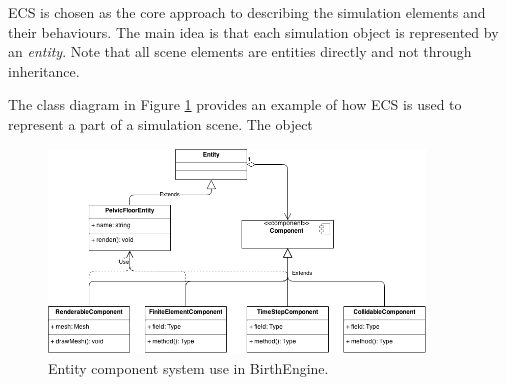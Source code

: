 ECS is chosen as the core approach to describing the simulation elements and their behaviours. The main idea is that each simulation object is represented by an \textit{entity}. Note that all scene elements are entities directly and not through inheritance.

The class diagram in Figure \ref{software-ecs} provides an example of how ECS is used to represent a part of a simulation scene. The object

\begin{figure}
\begin{center}
\includegraphics[width=100mm]{sections/methodology/images/software/software-ecs.png}
\caption[Entity component system use in BirthEngine.]{\label{software-ecs} Entity component system use in BirthEngine.}
\end{center}
\end{figure}
